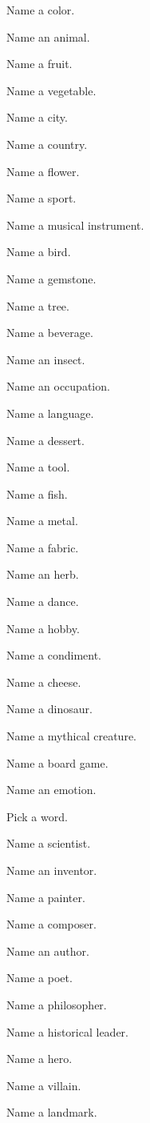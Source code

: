 \item Name a color.
\item Name an animal.
\item Name a fruit.
\item Name a vegetable.
\item Name a city.
\item Name a country.
\item Name a flower.
\item Name a sport.
\item Name a musical instrument.
\item Name a bird.
\item Name a gemstone.
\item Name a tree.
\item Name a beverage.
\item Name an insect.
\item Name an occupation.
\item Name a language.
\item Name a dessert.
\item Name a tool.
\item Name a fish.
\item Name a metal.
\item Name a fabric.
\item Name an herb.
\item Name a dance.
\item Name a hobby.
\item Name a condiment.
\item Name a cheese.
\item Name a dinosaur.
\item Name a mythical creature.
\item Name a board game.
\item Name an emotion.
\item Pick a word.
\item Name a scientist.
\item Name an inventor.
\item Name a painter.
\item Name a composer.
\item Name an author.
\item Name a poet.
\item Name a philosopher.
\item Name a historical leader.
\item Name a hero.
\item Name a villain.
\item Name a landmark.

